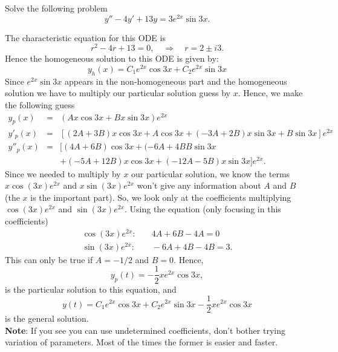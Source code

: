 \documentclass[11pt]{article}
\begin{document}
\begin{problem}
Solve the following problem
\begin{equation*}
     y''-4y'+13y=3e^{2x}\sin 3x.
\end{equation*}
\end{problem}
\begin{solution}
The characteristic equation for this ODE is 
\begin{equation}
r^2 -4r +13 =0, \quad  \Rightarrow \quad r= 2 \pm i 3.
\end{equation}
Hence the homogeneous solution to this ODE is given by:
\begin{equation}
y_{h}(x) = C_{1} e^{2 x} \cos 3x  + C_{2} e^{2x}\sin 3x
\end{equation}
Since $e^{2x}\sin 3x$ appears in the non-homogeneous part and the homogeneous solution we have to multiply our particular solution guess by $x$. Hence, we make the following guess
\begin{eqnarray*}
y_{p}(x) & = & (Ax\cos3x+Bx\sin3x)e^{2x} \\
y'_{p}(x) & = & [(2A+3B)x\cos 3x + A\cos3x+(-3A +2B)x \sin 3x + B\sin3x]e^{2x} \\
y''_{p}(x) & = & [(4A+6B)\cos3x+(-6A+4BB\sin 3x \\ & & + (-5A+12B)x\cos 3x + (-12A -5B)x \sin 3x]e^{2x}.
\end{eqnarray*}
Since we needed to multiply by $x$ our particular solution, we know the terms $x\cos (3x) e^{2x}$ and $x\sin (3x) e^{2x}$ won't give any information about $A$ and $B$ (the $x$ is the important part). So, we look only at the coefficients multiplying $\cos(3x)e^{2x}$ and $\sin(3x)e^{2x}$. Using the equation (only focusing in this coefficients)
\begin{equation*} \begin{split}
\cos(3x)e^{2x}:& \quad  4A +6B -4A = 0 \\
\sin(3x)e^{2x}:& \quad  -6A +4B -4B = 3.
\end{split}
\end{equation*}
This can only be true if $A = -1/2$ and $B=0$. Hence, 
$$y_{p}(t) = -\frac{1}{2}xe^{2x}\cos3x,$$ 
is the particular solution to this equation, and
\[\boxed{y(t) = C_{1} e^{2 x} \cos 3x  + C_{2} e^{2x}\sin 3x -\frac{1}{2}xe^{2x}\cos3x}\]
is the general solution. \\
\textbf{Note}: If you see you can use undetermined coefficients, don't bother trying variation of parameters. Most of the times the former is easier and faster. 
\end{solution}
\end{document}
